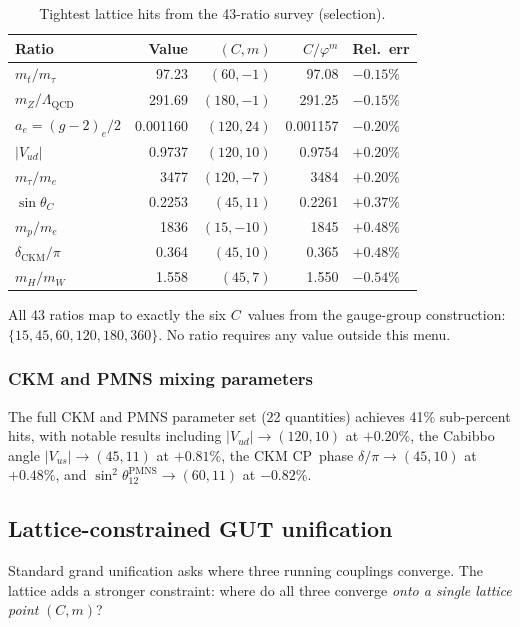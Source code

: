 \documentclass[12pt,a4paper]{article}
\newcommand{\vp}{\varphi}
\begin{document}
\begin{table}[H]
\centering
\caption{Tightest lattice hits from the 43-ratio survey (selection).}
\label{tab:tight_hits}
\begin{tabular}{@{}lrrrl@{}}
\toprule
Ratio & Value & $(C,m)$ & $C/\vp^m$ & Rel.~err \\
\midrule
$m_t/m_\tau$        & 97.23   & $(60, -1)$  & 97.08   & $-0.15\%$ \\
$m_Z/\Lambda_{\mathrm{QCD}}$ & 291.69  & $(180, -1)$ & 291.25  & $-0.15\%$ \\
$a_e = (g{-}2)_e/2$ & 0.001160 & $(120, 24)$ & 0.001157 & $-0.20\%$ \\
$|V_{ud}|$          & 0.9737  & $(120, 10)$ & 0.9754  & $+0.20\%$ \\
$m_\tau/m_e$         & 3477    & $(120, -7)$ & 3484    & $+0.20\%$ \\
$\sin\theta_C$      & 0.2253  & $(45, 11)$  & 0.2261  & $+0.37\%$ \\
$m_p/m_e$            & 1836    & $(15, -10)$ & 1845    & $+0.48\%$ \\
$\delta_{\mathrm{CKM}}/\pi$ & 0.364 & $(45, 10)$ & 0.365 & $+0.48\%$ \\
$m_H/m_W$           & 1.558   & $(45, 7)$   & 1.550   & $-0.54\%$ \\
\bottomrule
\end{tabular}
\end{table}

All 43 ratios map to exactly the six $C$~values from the gauge-group
construction: $\{15, 45, 60, 120, 180, 360\}$.  No ratio requires any
value outside this menu.

\subsubsection{CKM and PMNS mixing parameters}

The full CKM and PMNS parameter set (22 quantities) achieves 41\% sub-percent
hits, with notable results including $|V_{ud}| \to (120, 10)$ at $+0.20\%$,
the Cabibbo angle $|V_{us}| \to (45, 11)$ at $+0.81\%$, the CKM CP~phase
$\delta/\pi \to (45, 10)$ at $+0.48\%$, and $\sin^2\theta_{12}^{\mathrm{PMNS}}
\to (60, 11)$ at $-0.82\%$.

\subsection{Lattice-constrained GUT unification}
\label{sec:gut}

Standard grand unification asks where three running couplings converge.  The
lattice adds a stronger constraint: where do all three converge
\emph{onto a single lattice point} $(C, m)$?
\end{document}
